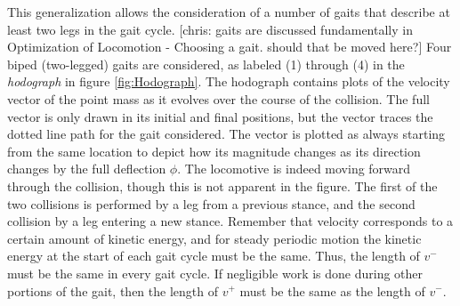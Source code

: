 This generalization allows the consideration of a number of gaits that describe at least two legs in the gait cycle. [chris: gaits are discussed fundamentally in Optimization of Locomotion - Choosing a gait. should that be moved here?] Four biped (two-legged) gaits are considered, as labeled (1) through (4) in the \textit{hodograph} in figure \ref{fig:Hodograph}. The hodograph contains plots of the velocity vector of the point mass as it evolves over the course of the collision. The full vector is only drawn in its initial and final positions, but the vector traces the dotted line path for the gait considered. The vector is plotted as always starting from the same location to depict how its magnitude changes as its direction changes by the full deflection $\phi$. The locomotive is indeed moving forward through the collision, though this is not apparent in the figure. The first of the two collisions is performed by a leg from a previous stance, and the second collision by a leg entering a new stance. Remember that velocity corresponds to a certain amount of kinetic energy, and for steady periodic motion the kinetic energy at the start of each gait cycle must be the same. Thus, the length of $v^{-}$ must be the same in every gait cycle. If negligible work is done during other portions of the gait, then the length of $v^{+}$ must be the same as the length of $v^{-}$. 

